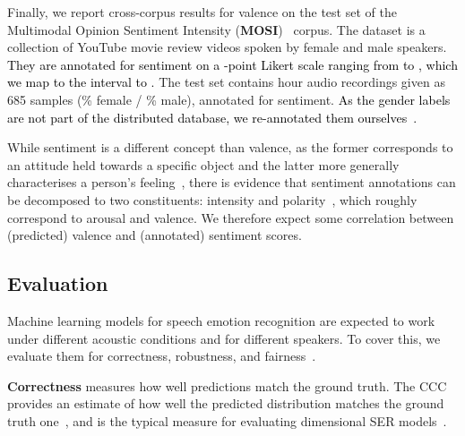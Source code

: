 \documentclass{article}
\newcommand{\review}[1]{\textcolor{black}{#1}}
\newcommand\mosi{\mbox{MOSI}}
\begin{document}
Finally, we report cross-corpus results for valence on the test set of the
Multimodal Opinion Sentiment Intensity (\textbf{\mosi})~\citep{zadeh2016mosi} corpus.
The dataset is a collection of YouTube movie review videos
spoken by  female and  male speakers.
\review{They are annotated for sentiment on a -point Likert scale ranging from  to , 
which we map to the interval  to .}
The test set contains  hour audio recordings
given as 685 samples (\% female / \% male),
annotated for sentiment.
\review{As the gender labels are not part of the distributed database,
we re-annotated them ourselves~\citep{wierstorf2023zenodo}.}

While sentiment is a different concept than valence,
as the former corresponds to an attitude held towards a specific object
and the latter more generally characterises a person's feeling~\citep{munezero2014they},
there is evidence that sentiment annotations can be decomposed to two constituents:
intensity and polarity~\citep{tian2018polarity},
which roughly correspond to arousal and valence.
We therefore expect some correlation between (predicted) valence
and (annotated) sentiment scores.





\subsection{Evaluation}
\label{subsec:evaluation}

Machine learning models for speech emotion recognition
are expected to work under different acoustic conditions and for different speakers.
To cover this,
we evaluate them for correctness, robustness, and fairness~\citep{zhang2019testing}.

\textbf{Correctness}
measures how well predictions match the ground truth.
The \acf{CCC} provides an estimate of how well the 
predicted distribution matches the ground truth one~\citep{lin1989ccc},
and is the typical measure for evaluating dimensional \ac{SER} models~\citep{ringeval2018avec}.
\end{document}
